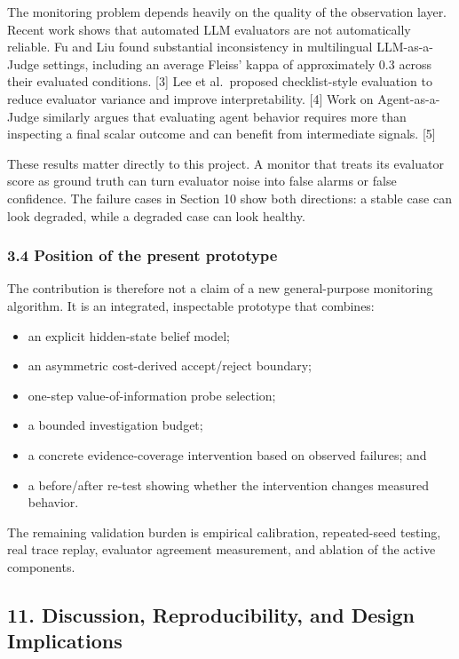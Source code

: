 \documentclass[
]{article}
\providecommand{\tightlist}{%
  \setlength{\itemsep}{0pt}\setlength{\parskip}{0pt}}
\begin{document}
The monitoring problem depends heavily on the quality of the observation
layer. Recent work shows that automated LLM evaluators are not
automatically reliable. Fu and Liu found substantial inconsistency in
multilingual LLM-as-a-Judge settings, including an average Fleiss' kappa
of approximately 0.3 across their evaluated conditions. {[}3{]} Lee et
al.~proposed checklist-style evaluation to reduce evaluator variance and
improve interpretability. {[}4{]} Work on Agent-as-a-Judge similarly
argues that evaluating agent behavior requires more than inspecting a
final scalar outcome and can benefit from intermediate signals. {[}5{]}

These results matter directly to this project. A monitor that treats its
evaluator score as ground truth can turn evaluator noise into false
alarms or false confidence. The failure cases in Section 10 show both
directions: a stable case can look degraded, while a degraded case can
look healthy.

\subsubsection{3.4 Position of the present
prototype}\label{position-of-the-present-prototype}

The contribution is therefore not a claim of a new general-purpose
monitoring algorithm. It is an integrated, inspectable prototype that
combines:

\begin{itemize}
\tightlist
\item
  an explicit hidden-state belief model;
\item
  an asymmetric cost-derived accept/reject boundary;
\item
  one-step value-of-information probe selection;
\item
  a bounded investigation budget;
\item
  a concrete evidence-coverage intervention based on observed failures;
  and
\item
  a before/after re-test showing whether the intervention changes
  measured behavior.
\end{itemize}

The remaining validation burden is empirical calibration, repeated-seed
testing, real trace replay, evaluator agreement measurement, and
ablation of the active components.

\subsection{11. Discussion, Reproducibility, and Design
Implications}\label{discussion-reproducibility-and-design-implications}
\end{document}
